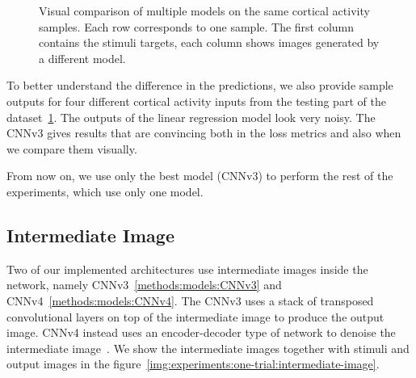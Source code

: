 \begin{figure}[H]
\caption{Visual comparison of multiple models on the same cortical activity samples. Each row corresponds to one sample. The first column contains the stimuli targets, each column shows images generated by a different model.}
\label{img:experiments:one-trial:comparison-outputs}
\end{figure}

To better understand the difference in the predictions, we also provide sample outputs for four different cortical activity inputs from the testing part of the dataset~\ref{img:experiments:one-trial:comparison-outputs}. The outputs of the linear regression model look very noisy. The CNNv3 gives results that are convincing both in the loss metrics and also when we compare them visually.

From now on, we use only the best model (CNNv3) to perform the rest of the experiments, which use only one model.


\subsection{Intermediate Image}
\label{experiments:one-trial:intermediate-image}
Two of our implemented architectures use intermediate images inside the network, namely CNNv3~\ref{methods:models:CNNv3} and CNNv4~\ref{methods:models:CNNv4}. The CNNv3 uses a stack of transposed convolutional layers on top of the intermediate image to produce the output image. CNNv4 instead uses an encoder-decoder type of network to denoise the intermediate image~\citep{zhang2020reconstruction}. We show the intermediate images together with stimuli and output images in the figure~\ref{img:experiments:one-trial:intermediate-image}.


